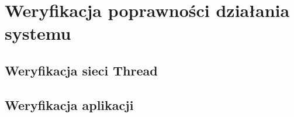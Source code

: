 \chapter{Weryfikacja poprawności działania systemu}

\section{Weryfikacja sieci Thread}

\section{Weryfikacja aplikacji}